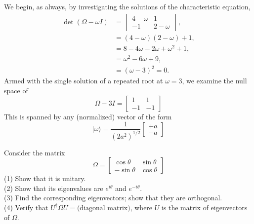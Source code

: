 \documentclass[../principles-of-quantum-mechanics.tex]{subfiles}
\begin{document}
\begin{questions}
\begin{solution}
	We begin, as always, by investigating the solutions of the characteristic equation,
	\begin{align*}
		\det(\Omega - \omega{I}) &= \begin{vmatrix}4 - \omega & 1 \\ -1 & 2 - \omega\end{vmatrix}, \\
		&= (4-\omega)(2-\omega) + 1, \\
		&= 8 - 4\omega - 2\omega + \omega^2 + 1, \\
		&= \omega^2 - 6\omega + 9, \\
		&= (\omega-3)^2 = 0.
	\end{align*}
	Armed with the single solution of a repeated root at $\omega=3$, we examine the null space of
	\[
		\Omega - 3I = \begin{bmatrix}1 & 1 \\ -1 & -1\end{bmatrix}
	\]
	This is spanned by any (normalized) vector of the form
	\[
		|\omega\rangle = \frac{1}{(2a^2)^{1/2}}\begin{bmatrix}+a \\ -a\end{bmatrix}
	\]
\end{solution}

\question Consider the matrix
\[
	\Omega = \begin{bmatrix}\cos\theta & \sin\theta \\ -\sin\theta & \cos\theta \end{bmatrix}
\]
(1) Show that it is unitary. \\
(2) Show that its eigenvalues are $e^{i\theta}$ and $e^{-i\theta}$. \\
(3) Find the corresponding eigenvectors; show that they are orthogonal. \\
(4) Verify that $U^\dagger\Omega{U}=\text{(diagonal matrix)}$, where $U$ is the matrix of eigenvectors of $\Omega$.


\end{questions}
\end{document}

